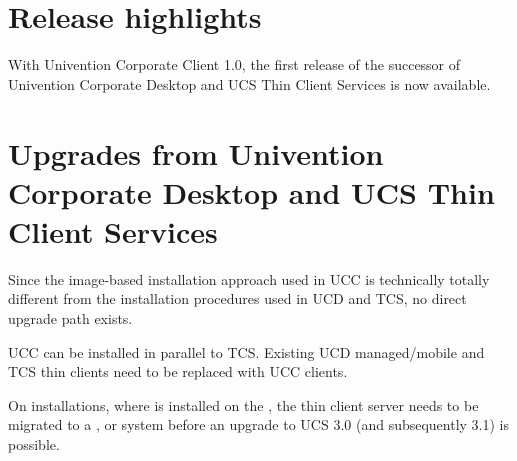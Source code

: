 


\newcommand{\ucsManualTitle}{UCC 1.0 Release Notes}
\newcommand{\ucsManualSubtitle}{Release notes for the installation of Univention Corporate Server (UCS) 1.0}
\newcommand{\ucsManualVersion}{1.0}
\newcommand{\ucsTechAuthor}{ & Univention GmbH & feedback@univention.de}

\setcounter{secnumdepth}{3}
\setcounter{tocdepth}{3}



\chapter{Release highlights}

With Univention Corporate Client 1.0, the first release of the
successor of Univention Corporate Desktop and UCS Thin Client Services
is now available.

\chapter{Upgrades from Univention Corporate Desktop and UCS Thin Client Services}
Since the image-based installation approach used in UCC is technically
totally different from the installation procedures used in UCD and
TCS, no direct upgrade path exists.

UCC can be installed in parallel to TCS. Existing UCD managed/mobile
and TCS thin clients need to be replaced with UCC clients.

On installations, where \ucsTCS{} is installed on the \ucsMaster{},
the thin client server needs to be migrated to
a \ucsBackup{}, \ucsSlave{} or \ucsMember{} system before an upgrade
to UCS 3.0 (and subsequently 3.1) is possible.




